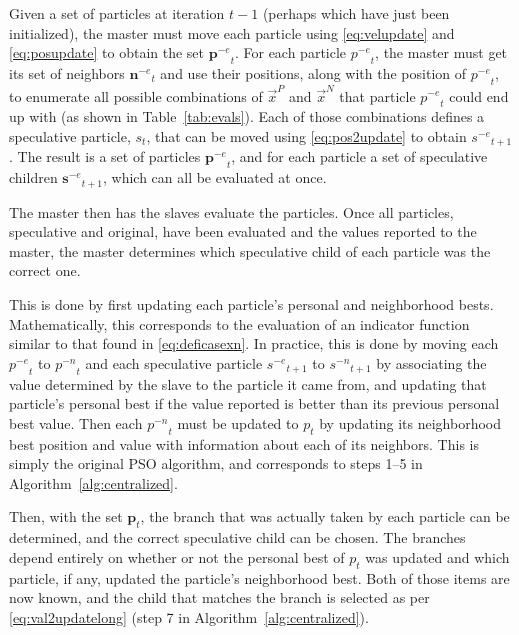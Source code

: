 \documentclass[journal,letterpaper]{IEEEtran}
\newcommand{\alg}[1]{Algorithm~\ref{alg:#1}}
\providecommand{\pers}{\ensuremath{P}}
\providecommand{\neigh}{\ensuremath{N}}
\providecommand{\nbest}{\ensuremath{\Vec{x}^\neigh}}
\providecommand{\pbest}{\ensuremath{\Vec{x}^\pers}}
\providecommand{\noeval}[1]{\ensuremath{#1^{-e}}}
\providecommand{\nonbest}[1]{\ensuremath{#1^{-n}}}
\providecommand{\p}{\ensuremath{p}}
\providecommand{\pset}{\ensuremath{\mathbf{p}}}
\providecommand{\s}{\ensuremath{s}}
\providecommand{\sset}{\ensuremath{\mathbf{s}}}
\providecommand{\nset}{\ensuremath{\mathbf{n}}}
\begin{document}
Given a set of particles at iteration $t-1$ (perhaps which have just been
initialized), the master must move each particle using
\eqref{eq:velupdate} and \eqref{eq:posupdate} to obtain the set
$\noeval{\pset}_t$.  For each particle $\noeval{\p}_t$, the master must get its
set of neighbors $\noeval{\nset}_t$ and use their positions, along with the
position of $\noeval{\p}_t$, to enumerate all possible combinations of $\pbest$
and $\nbest$ that particle $\noeval{\p}_t$ could end up with (as shown in
Table~\ref{tab:evals}).  Each of those combinations defines a speculative
particle, $\s_t$, that can be moved using \eqref{eq:pos2update} to
obtain $\noeval{\s}_{t+1}$.  The result is a set of particles
$\noeval{\pset}_t$, and for each particle a set of speculative children
$\noeval{\sset}_{t+1}$, which can all be evaluated at once.

The master then has the slaves evaluate the particles.  Once all particles,
speculative and original, have been evaluated and the values reported to the
master, the master determines which speculative child of each particle was the
correct one.

This is done by first updating each particle's personal and neighborhood bests.
Mathematically, this corresponds to the evaluation of an indicator function
similar to that found in \eqref{eq:deficasexn}.  In practice, this is
done by moving each $\noeval{\p}_t$ to $\nonbest{\p}_t$ and each speculative
particle $\noeval{\s}_{t+1}$ to $\nonbest{\s}_{t+1}$ by associating the value
determined by the slave to the particle it came from, and updating that
particle's personal best if the value reported is better than its previous
personal best value.  Then each $\nonbest{\p}_t$ must be updated to $\p_t$ by
updating its neighborhood best position and value with information about each
of its neighbors.  This is simply the original PSO algorithm, and corresponds
to steps 1--5 in \alg{centralized}.

Then, with the set $\pset_t$, the branch that was actually taken by each
particle can be determined, and the correct speculative child can be chosen.
The branches depend entirely on whether or not the personal best of $p_t$ was
updated and which particle, if any, updated the particle's neighborhood best.
Both of those items are now known, and the child that matches the branch is
selected as per \eqref{eq:val2updatelong} (step 7 in
\alg{centralized}).
\end{document}
